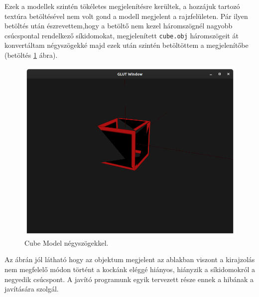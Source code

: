 Ezek a modellek szintén tökéletes megjelenítésre kerültek, a hozzájuk tartozó textúra betöltésével nem volt gond a modell megjelent a rajzfelületen.
\newpage
Pár ilyen betöltés után észrevettem,hogy a betöltő nem kezel háromszögnél nagyobb csúcspontal rendelkező síkidomokat,   megjelenített \texttt{cube.obj} háromszögeit át konvertáltam négyszögekké majd ezek után szintén betöltöttem a megjelenítőbe (betöltés \ref{fig:model2} ábra).
\bigskip
\begin{figure}[h]
\centering
\includegraphics[width=\textwidth]{images/Model_quads.png}
\caption{Cube Model négyszögekkel.}
\label{fig:model2}
\end{figure}
\bigskip

Az ábrán jól látható hogy az objektum megjelent az ablakban viszont a kirajzolás nem megfelelő módon történt a kockánk eléggé hiányos, hiányzik a síkidomokról a negyedik csúcspont. A javító programunk egyik tervezett része ennek a hibának a javítására szolgál.
